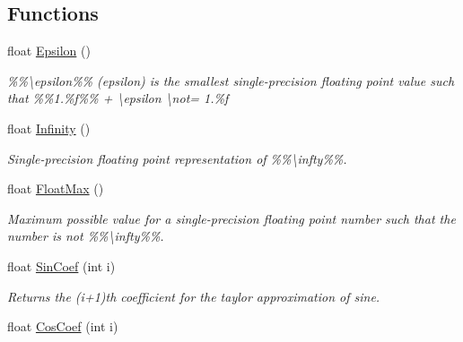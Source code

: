 \subsection*{Functions}
\begin{DoxyCompactItemize}
\item 
\hypertarget{group___scalar_math_consts_gafaec804c6b9d6173f5c1fc07ae7fda13}{}float \hyperlink{group___scalar_math_consts_gafaec804c6b9d6173f5c1fc07ae7fda13}{Epsilon} ()\label{group___scalar_math_consts_gafaec804c6b9d6173f5c1fc07ae7fda13}

\begin{DoxyCompactList}\small\item\em \%\%\textbackslash{}epsilon\%\% (epsilon) is the smallest single-\/precision floating point value such that \%\%1.\%f\%\% + \textbackslash{}epsilon \textbackslash{}not= 1.\%f \end{DoxyCompactList}\item 
\hypertarget{group___scalar_math_consts_gaf3d71b863bc7ac057d0928590246578e}{}float \hyperlink{group___scalar_math_consts_gaf3d71b863bc7ac057d0928590246578e}{Infinity} ()\label{group___scalar_math_consts_gaf3d71b863bc7ac057d0928590246578e}

\begin{DoxyCompactList}\small\item\em Single-\/precision floating point representation of \%\%\textbackslash{}infty\%\%. \end{DoxyCompactList}\item 
\hypertarget{group___scalar_math_consts_ga992fb71755b0697662cf03672daf4b1f}{}float \hyperlink{group___scalar_math_consts_ga992fb71755b0697662cf03672daf4b1f}{Float\+Max} ()\label{group___scalar_math_consts_ga992fb71755b0697662cf03672daf4b1f}

\begin{DoxyCompactList}\small\item\em Maximum possible value for a single-\/precision floating point number such that the number is not \%\%\textbackslash{}infty\%\%. \end{DoxyCompactList}\item 
\hypertarget{group___scalar_math_consts_ga84de592aedd66fb57593a14b25555f2f}{}float \hyperlink{group___scalar_math_consts_ga84de592aedd66fb57593a14b25555f2f}{Sin\+Coef} (int i)\label{group___scalar_math_consts_ga84de592aedd66fb57593a14b25555f2f}

\begin{DoxyCompactList}\small\item\em Returns the (i+1)th coefficient for the taylor approximation of sine. \end{DoxyCompactList}\item 
\hypertarget{group___scalar_math_consts_gaa3c80693c5730cf478e5d98f73e6a72c}{}float \hyperlink{group___scalar_math_consts_gaa3c80693c5730cf478e5d98f73e6a72c}{Cos\+Coef} (int i)\label{group___scalar_math_consts_gaa3c80693c5730cf478e5d98f73e6a72c}


\end{DoxyCompactItemize}
